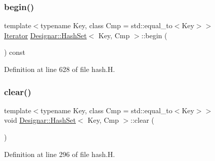 \mbox{\label{class_designar_1_1_hash_set_a5b52ed8084a3a6e9c97dd90f690cf520}} 
\subsubsection{\texorpdfstring{begin()}{begin()}\hspace{0.1cm}{\footnotesize\ttfamily [2/2]}}
{\footnotesize\ttfamily template$<$typename Key, class Cmp = std\+::equal\+\_\+to$<$\+Key$>$$>$ \\
\hyperlink{class_designar_1_1_hash_set_1_1_iterator}{Iterator} \hyperlink{class_designar_1_1_hash_set}{Designar\+::\+Hash\+Set}$<$ Key, Cmp $>$\+::begin (\begin{DoxyParamCaption}{ }\end{DoxyParamCaption}) const\hspace{0.3cm}{\ttfamily [inline]}}



Definition at line 628 of file hash.\+H.

\mbox{\label{class_designar_1_1_hash_set_a9f2acc5d38a16b2bfe8586ecea9d2df7}} 
\subsubsection{\texorpdfstring{clear()}{clear()}}
{\footnotesize\ttfamily template$<$typename Key, class Cmp = std\+::equal\+\_\+to$<$\+Key$>$$>$ \\
void \hyperlink{class_designar_1_1_hash_set}{Designar\+::\+Hash\+Set}$<$ Key, Cmp $>$\+::clear (\begin{DoxyParamCaption}{ }\end{DoxyParamCaption})\hspace{0.3cm}{\ttfamily [inline]}}



Definition at line 296 of file hash.\+H.

\mbox{\label{class_designar_1_1_hash_set_ab3be22892d61b954068510bbdd6f6df8}} 
